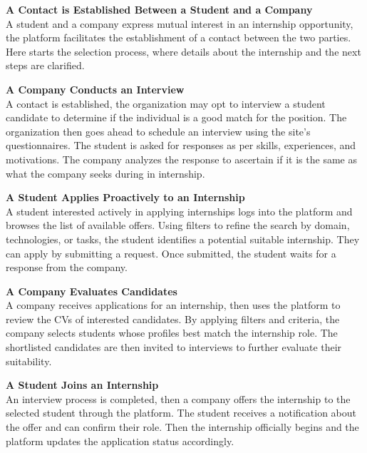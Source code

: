 \documentclass[12pt]{article}
\numberwithin{figure}{section}
\numberwithin{table}{section}
\begin{document}
\vspace{0.5cm}

\textbf{A Contact is Established Between a Student and a Company} \\
A student and a company express mutual interest in an internship opportunity, the platform facilitates the establishment of a contact between the two parties. Here starts the selection process, where details about the internship and the next steps are clarified.

\newpage
\textbf{A Company Conducts an Interview} \\
A contact is established, the organization may opt to interview a student candidate to determine if the individual is a good match for the position. The organization then goes ahead to schedule an interview using the site's questionnaires. The student is asked for responses as per skills, experiences, and motivations. The company analyzes the response to ascertain if it is the same as what the company seeks during in internship.

\vspace{0.5cm}

\textbf{A Student Applies Proactively to an Internship} \\
A student interested actively in applying internships logs into the platform and browses the list of available offers. Using filters to refine the search by domain, technologies, or tasks, the student identifies a potential suitable internship. They can apply by submitting a request. Once submitted, the student waits for a response from the company.

\vspace{0.5cm}

\textbf{A Company Evaluates Candidates} \\
A company receives applications for an internship, then uses the platform to review the CVs of interested candidates. By applying filters and criteria, the company selects students whose profiles best match the internship role. The shortlisted candidates are then invited to interviews to further evaluate their suitability.

\vspace{0.5cm}

\textbf{A Student Joins an Internship} \\
An interview process is completed, then a company offers the internship to the selected student through the platform. The student receives a notification about the offer and can confirm their role. Then the internship officially begins and the platform updates the application status accordingly.
\end{document}
